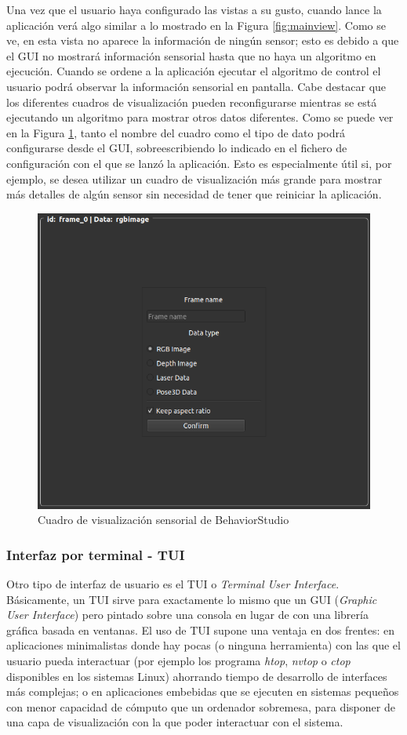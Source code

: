 Una vez que el usuario haya configurado las vistas a su gusto, cuando lance la aplicación verá algo similar a lo mostrado en la Figura \ref{fig:mainview}. Como se ve, en esta vista no aparece la información de ningún sensor; esto es debido a que el GUI no mostrará información sensorial hasta que no haya un algoritmo en ejecución. Cuando se ordene a la aplicación ejecutar el algoritmo de control el usuario podrá observar la información sensorial en pantalla. Cabe destacar que los diferentes cuadros de visualización pueden reconfigurarse mientras se está ejecutando un algoritmo para mostrar otros datos diferentes. Como se puede ver en la Figura \ref{fig:frame}, tanto el nombre del cuadro como el tipo de dato podrá configurarse desde el GUI, sobreescribiendo lo indicado en el fichero de configuración con el que se lanzó la aplicación. Esto es especialmente útil si, por ejemplo, se desea utilizar un cuadro de visualización más grande para mostrar más detalles de algún sensor sin necesidad de tener que reiniciar la aplicación.

\begin{figure}
  \centering
  \includegraphics[width=.8\linewidth]{img/frame}
  \caption{Cuadro de visualización sensorial de BehaviorStudio}
  \label{fig:frame}
\end{figure}

\subsubsection{Interfaz por terminal - TUI}

Otro tipo de interfaz de usuario es el TUI o \textit{Terminal User Interface}. Básicamente, un TUI sirve para exactamente lo mismo que un GUI (\textit{Graphic User Interface}) pero pintado sobre una consola en lugar de con una librería gráfica basada en ventanas. El uso de TUI supone una ventaja en dos frentes: en aplicaciones minimalistas donde hay pocas (o ninguna herramienta) con las que el usuario pueda interactuar (por ejemplo los programa \textit{htop}, \textit{nvtop} o \textit{ctop} disponibles en los sistemas Linux) ahorrando tiempo de desarrollo de interfaces más complejas; o en aplicaciones embebidas que se ejecuten en sistemas pequeños con menor capacidad de cómputo que un ordenador sobremesa, para disponer de una capa de visualización con la que poder interactuar con el sistema.

